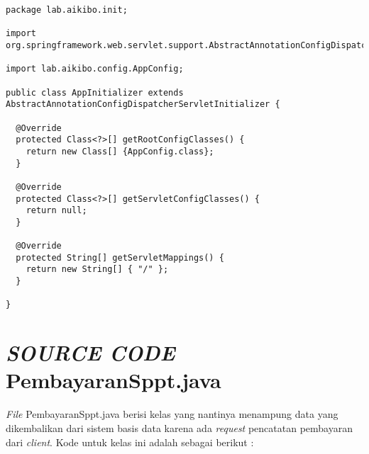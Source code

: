 \documentclass[pdftex,12pt, oneside]{article}
\begin{document}
\begin{lstlisting}
package lab.aikibo.init;

import org.springframework.web.servlet.support.AbstractAnnotationConfigDispatcherServletInitializer;

import lab.aikibo.config.AppConfig;

public class AppInitializer extends AbstractAnnotationConfigDispatcherServletInitializer {

  @Override
  protected Class<?>[] getRootConfigClasses() {
    return new Class[] {AppConfig.class};
  }

  @Override
  protected Class<?>[] getServletConfigClasses() {
    return null;
  }

  @Override
  protected String[] getServletMappings() {
    return new String[] { "/" };
  }

}
\end{lstlisting}


\section{\textit{SOURCE CODE} PembayaranSppt.java}

\textit{File} PembayaranSppt.java berisi kelas yang nantinya menampung data yang dikembalikan dari sistem basis data karena ada \textit{request} pencatatan pembayaran dari \textit{client}. Kode untuk kelas ini adalah sebagai berikut :
\end{document}
